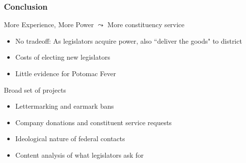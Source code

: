 \documentclass[xcolor=dvipsnames]{beamer}
\begin{document}
\begin{frame}
\frametitle{Conclusion}

More Experience, More Power $\leadsto$ More constituency service

\begin{itemize}
	\item No tradeoff: As legislators acquire power, also ``deliver the goods" to district
	\item \alert{Costs} of electing new legislators 
	\item Little evidence for Potomac Fever
\end{itemize}

Broad set of projects 
\begin{itemize}
	\item Lettermarking and earmark bans
	\item Company donations and constituent service requests
	\item Ideological nature of federal contacts
	\item Content analysis of what legislators ask for
\end{itemize}	



\end{frame}
\end{document}

